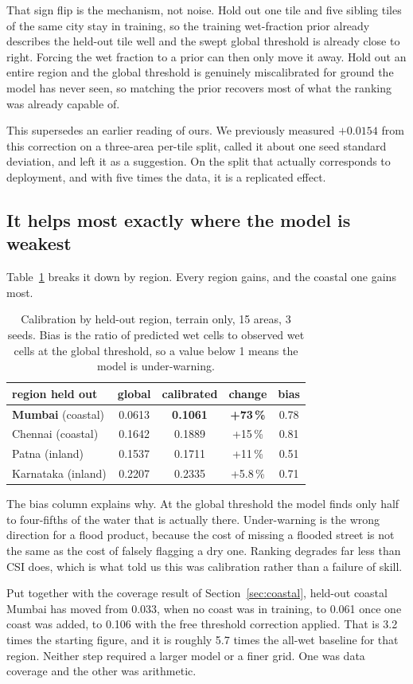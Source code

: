 That sign flip is the mechanism, not noise. Hold out one tile and five sibling tiles of the same
city stay in training, so the training wet-fraction prior already describes the held-out tile well
and the swept global threshold is already close to right. Forcing the wet fraction to a prior can
then only move it away. Hold out an entire region and the global threshold is genuinely
miscalibrated for ground the model has never seen, so matching the prior recovers most of what the
ranking was already capable of.

This supersedes an earlier reading of ours. We previously measured $+0.0154$ from this correction
on a three-area per-tile split, called it about one seed standard deviation, and left it as a
suggestion. On the split that actually corresponds to deployment, and with five times the data, it
is a replicated effect.

\subsection{It helps most exactly where the model is weakest}
Table~\ref{tab:calregion} breaks it down by region. Every region gains, and the coastal one gains
most.

\begin{table}[!t]
\centering
\caption{Calibration by held-out region, terrain only, 15 areas, 3 seeds. Bias is the ratio of
predicted wet cells to observed wet cells at the global threshold, so a value below 1 means the
model is under-warning.}
\label{tab:calregion}
\begin{tabular}{lcccc}
\toprule
region held out & global & calibrated & change & bias \\
\midrule
\textbf{Mumbai} (coastal)   & 0.0613 & \textbf{0.1061} & \textbf{+73\,\%} & 0.78 \\
Chennai (coastal)           & 0.1642 & 0.1889 & +15\,\% & 0.81 \\
Patna (inland)              & 0.1537 & 0.1711 & +11\,\% & 0.51 \\
Karnataka (inland)          & 0.2207 & 0.2335 & +5.8\,\% & 0.71 \\
\bottomrule
\end{tabular}
\end{table}

The bias column explains why. At the global threshold the model finds only half to four-fifths of
the water that is actually there. Under-warning is the wrong direction for a flood product, because
the cost of missing a flooded street is not the same as the cost of falsely flagging a dry one.
Ranking degrades far less than CSI does, which is what told us this was calibration rather than a
failure of skill.

Put together with the coverage result of Section~\ref{sec:coastal}, held-out coastal Mumbai has
moved from 0.033, when no coast was in training, to 0.061 once one coast was added, to 0.106 with
the free threshold correction applied. That is 3.2 times the starting figure, and it is roughly
5.7 times the all-wet baseline for that region. Neither step required a larger model or a finer
grid. One was data coverage and the other was arithmetic.
